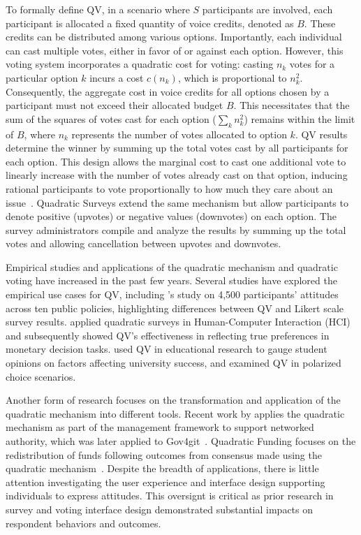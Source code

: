 To formally define QV, in a scenario where $S$ participants are involved, each participant is allocated a fixed quantity of voice credits, denoted as $B$. These credits can be distributed among various options. Importantly, each individual can cast multiple votes, either in favor of or against each option. However, this voting system incorporates a quadratic cost for voting: casting $n_k$ votes for a particular option $k$ incurs a cost $c(n_k)$, which is proportional to $n_k^2$. Consequently, the aggregate cost in voice credits for all options chosen by a participant must not exceed their allocated budget $B$. This necessitates that the sum of the squares of votes cast for each option ($\sum_k n_k^2$) remains within the limit of $B$, where $n_k$ represents the number of votes allocated to option $k$. QV results determine the winner by summing up the total votes cast by all participants for each option. This design allows the marginal cost to cast one additional vote to linearly increase with the number of votes already cast on that option, inducing rational participants to vote proportionally to how much they care about an issue~\cite{posner2018radical}. Quadratic Surveys extend the same mechanism but allow participants to denote positive (upvotes) or negative values (downvotes) on each option. The survey administrators compile and analyze the results by summing up the total votes and allowing cancellation between upvotes and downvotes.

Empirical studies and applications of the quadratic mechanism and quadratic voting have increased in the past few years. Several studies have explored the empirical use cases for QV, including \textcite{quarfoot2017quadratic}'s study on 4,500 participants' attitudes across ten public policies, highlighting differences between QV and Likert scale survey results. \textcite{chengCanShowWhat2021} applied quadratic surveys in Human-Computer Interaction (HCI) and subsequently showed QV's effectiveness in reflecting true preferences in monetary decision tasks. \textcite{naylor2017first} used QV in educational research to gauge student opinions on factors affecting university success, and \textcite{cavailleWhoCaresMeasuring} examined QV in polarized choice scenarios.

Another form of research focuses on the transformation and application of the quadratic mechanism into different tools. Recent work by \textcite{southPluralManagement2024} applies the quadratic mechanism as part of the management framework to support networked authority, which was later applied to Gov4git~\cite{Gov4gitDecentralizedPlatform2023}. Quadratic Funding focuses on the redistribution of funds following outcomes from consensus made using the quadratic mechanism~\cite{buterinFlexibleDesignFunding2019a, freitasQuadraticFundingIncomplete2024}. Despite the breadth of applications, there is little attention investigating the user experience and interface design supporting individuals to express attitudes. This oversignt is critical as prior research in survey and voting interface design demonstrated substantial impacts on respondent behaviors and outcomes.

